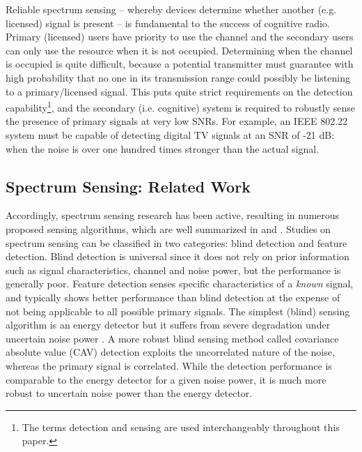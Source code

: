 \documentclass[draftclsnofoot,onecolumn,12pt]{IEEEtran}
\begin{document}
Reliable spectrum sensing -- whereby devices determine whether another (e.g. licensed) signal is present -- is fundamental to the success of cognitive radio.  Primary (licensed) users have priority to use the channel and the secondary users can only use the resource when it is not occupied.  Determining when the channel is occupied is quite difficult, because a potential transmitter must guarantee with high probability that no one in its transmission range could possibly be listening to a primary/licensed signal.  This puts quite strict requirements on the detection capability\footnote{The terms detection and sensing are used
interchangeably throughout this paper.}, and the secondary (i.e. cognitive) system is required to robustly sense the presence of primary signals at very low SNRs. For example, an IEEE 802.22 system must be capable of detecting digital TV signals at an SNR of -21 dB: when the noise is over one hundred times stronger than the actual signal.

\subsection{Spectrum Sensing: Related Work}

Accordingly, spectrum sensing research has been active, resulting in numerous proposed sensing algorithms, which are well summarized in \cite{Shellhammer08} and \cite{YucArs09}. Studies on spectrum sensing can be
classified in two categories: blind detection and feature detection. Blind detection is universal since it does not rely on prior information such as signal characteristics, channel and noise power, but the performance is generally poor. Feature detection senses specific characteristics of a {\em known} signal, and typically shows better performance than blind detection at the expense of not being applicable to all possible primary signals.  The simplest (blind) sensing algorithm is an energy detector but it suffers from severe degradation under uncertain noise power \cite{Urkowitz67, SonFis92, TanSah08}. A more robust blind sensing method called covariance absolute value (CAV) detection \cite{ZenLia09} exploits the uncorrelated nature of the noise, whereas the primary signal is correlated. While the detection performance is comparable to the energy detector for a given noise power, it is much more robust to uncertain noise power than the energy detector.
\end{document}
